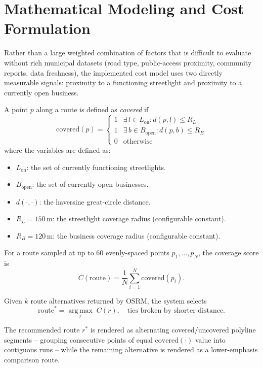 \documentclass[conference]{IEEEtran}
\begin{document}
\section{Mathematical Modeling and Cost Formulation}
\label{sec:scoring}

Rather than a large weighted combination of factors that is difficult to evaluate without rich municipal datasets (road type, public-access proximity, community reports, data freshness), the implemented cost model uses two directly measurable signals: proximity to a functioning streetlight and proximity to a currently open business.

A point $p$ along a route is defined as \emph{covered} if
\begin{equation}
\text{covered}(p) = \begin{cases}
1 & \exists\, l \in L_{\text{on}} : d(p, l) \leq R_L \\
1 & \exists\, b \in B_{\text{open}} : d(p, b) \leq R_B \\
0 & \text{otherwise}
\end{cases}
\label{eq:covered}
\end{equation}
where the variables are defined as:
\begin{itemize}
\item $L_{\text{on}}$: the set of currently functioning streetlights.
\item $B_{\text{open}}$: the set of currently open businesses.
\item $d(\cdot,\cdot)$: the haversine great-circle distance.
\item $R_L = 150$\,m: the streetlight coverage radius (configurable constant).
\item $R_B = 120$\,m: the business coverage radius (configurable constant).
\end{itemize}

For a route sampled at up to 60 evenly-spaced points $p_1,\dots,p_N$, the coverage score is
\begin{equation}
C(\text{route}) = \frac{1}{N}\sum_{i=1}^{N} \text{covered}(p_i).
\label{eq:coverage}
\end{equation}

Given $k$ route alternatives returned by OSRM, the system selects
\begin{equation}
\text{route}^\ast = \operatorname*{arg\,max}_{r} \; C(r), \quad \text{ties broken by shorter distance.}
\label{eq:select}
\end{equation}

The recommended route $r^\ast$ is rendered as alternating covered/uncovered polyline segments -- grouping consecutive points of equal $\text{covered}(\cdot)$ value into contiguous runs -- while the remaining alternative is rendered as a lower-emphasis comparison route.
\end{document}
